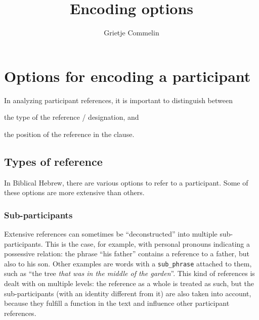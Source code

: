 \documentclass{report}
\title{Encoding options}
\author{Grietje Commelin}
\newcommand{\mi}[1]{\lstinline{#1}}
\begin{document}
\maketitle


\section{Options for encoding a participant}

In analyzing participant references, it is important to distinguish between
\begin{enumerate*}[label=\itshape\alph*\upshape)]
\item the type of the reference / designation, and
\item the position of the reference in the clause.
\end{enumerate*}

\subsection{Types of reference}
In Biblical Hebrew, there are various options to refer to a participant. Some of these options are more extensive than others.


\subsubsection{Sub-participants}
Extensive references can sometimes be ``deconstructed'' into multiple sub-participants. This is the case, for example, with personal pronouns indicating a possessive relation: the phrase ``his father'' contains a reference to a father, but also to his son. Other examples are words with a \mi{sub_phrase} attached to them, such as ``the tree \emph{that was in the middle of the garden}''. This kind of references is dealt with on multiple levels: the reference as a whole is treated as such, but the sub-participants (with an identity different from it) are also taken into account, because they fulfill a function in the text and influence other participant references.
\end{document}
